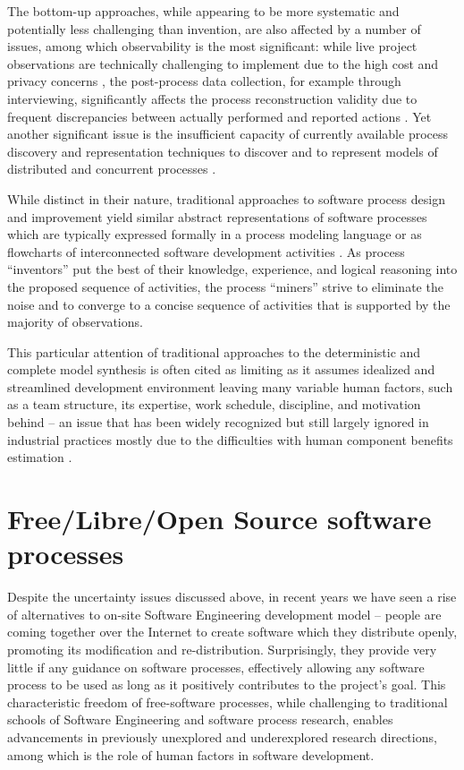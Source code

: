 The bottom-up approaches, while appearing to be more systematic and potentially less challenging than invention, 
are also affected by a number of issues, among which observability is the most significant: 
while live project observations are technically challenging to implement due to the high cost and 
privacy concerns \cite{citeulike:12944447}, the post-process data collection, for example through interviewing, 
significantly affects the process reconstruction validity due to frequent discrepancies between actually 
performed and reported actions \cite{citeulike:7691059}. 
Yet another significant issue is the insufficient capacity of currently available process discovery and 
representation techniques to discover and to represent models of distributed and concurrent processes 
\cite{citeulike:12944447}. 

While distinct in their nature, traditional approaches to software process design and 
improvement yield similar abstract representations of software processes which are typically expressed 
formally in a process modeling language or as flowcharts of interconnected software 
development activities \cite{citeulike:12944447} \cite{sacchi_2001}.
As process ``inventors'' put the best of their knowledge, experience, and logical reasoning into the proposed 
sequence of activities, the process ``miners'' strive to eliminate the noise and to converge to a 
concise sequence of activities that is supported by the majority of observations. 

This particular attention of traditional approaches to the deterministic and complete model synthesis 
is often cited as limiting as it assumes idealized and streamlined development environment leaving many variable 
human factors, such as a team structure, its expertise, work schedule, discipline, and motivation behind -- 
an issue that has been widely recognized 
\cite{citeulike:149387} \cite{citeulike:113403} \cite{citeulike:205322} \cite{citeulike:12798652}
but still largely ignored in industrial practices mostly due to the  difficulties with human component 
benefits estimation \cite{citeulike:12798659} \cite{citeulike:12798662} \cite{csdl2-12-11}.

%
%
\section{Free/Libre/Open Source software processes}\label{oss_processes}
Despite the uncertainty issues discussed above, in recent years we have seen a rise of alternatives to on-site 
Software Engineering development model -- people are coming together over the Internet to create software 
which they distribute openly, promoting its modification and re-distribution. 
Surprisingly, they provide very little if any guidance on software processes, effectively allowing any 
software process to be used as long as it positively contributes to the project's goal. 
This characteristic freedom of free-software processes, while challenging to traditional schools of 
Software Engineering and software process research, enables advancements in previously unexplored 
and underexplored research directions, among which is the role of human factors in software development.

